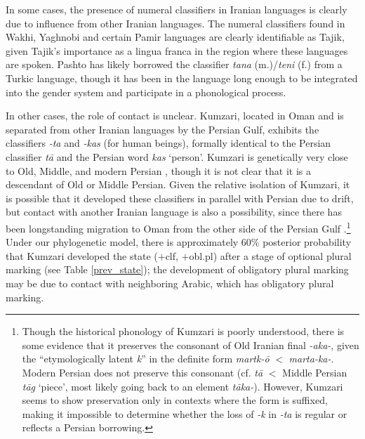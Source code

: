 \documentclass[11pt]{article}
\begin{document}
In some cases, the presence of numeral classifiers in Iranian languages is clearly due to influence from other Iranian languages. 
The numeral classifiers found in Wakhi, Yaghnobi and certain Pamir languages are clearly identifiable as Tajik, given Tajik's importance as a lingua franca in the region where these languages are spoken. 
Pashto has likely borrowed the classifier {\it tana} (m.)/{\it teni} (f.) from a Turkic language, though it has been in the language long enough to be integrated into the gender system and participate in a phonological process. 

In other cases, the role of contact is unclear. Kumzari, located in Oman and is separated from other Iranian languages by the Persian Gulf, exhibits the classifiers {\it -ta} and {\it -kas} (for human beings), formally identical to the Persian classifier {\it t\=a} and the Persian word {\it kas} `person'. Kumzari is genetically very close to Old, Middle, and modern Persian \citep{Skjaervo1989b}, though it is not clear that it is a descendant of Old or Middle Persian. Given the relative isolation of Kumzari, it is possible that it developed these classifiers in parallel with Persian due to drift, %
but contact with another Iranian language is also a possibility, since there has been longstanding migration to Oman from the other side of the Persian Gulf \citep{Barth1983}.\footnote{Though the historical phonology of Kumzari is poorly understood, there is some evidence that it preserves the consonant of Old Iranian final {\it *-aka-}, given the ``etymologically latent {\it k}'' in the definite form {\it martk-\=o} \citep[38]{WalAnonby2015} $<$ {\it *marta-ka-}. Modern Persian does not preserve this consonant (cf. {\it t\=a} $<$ Middle Persian {\it t\=ag} `piece', most likely going back to an element {\it *t\=aka-}). However, Kumzari seems to show preservation only in contexts where the form is suffixed, making it impossible to determine whether the loss of {\it -k} in {\it -ta} is regular or reflects a Persian borrowing.} 
Under our phylogenetic model, there is approximately 60\% posterior probability that Kumzari developed the state ($+${\sc clf}, $+${\sc obl.pl}) after a stage of optional plural marking (see Table \ref{prev_state}); the development of obligatory plural marking may be due to contact with neighboring Arabic, which has obligatory plural marking. 
\end{document}
